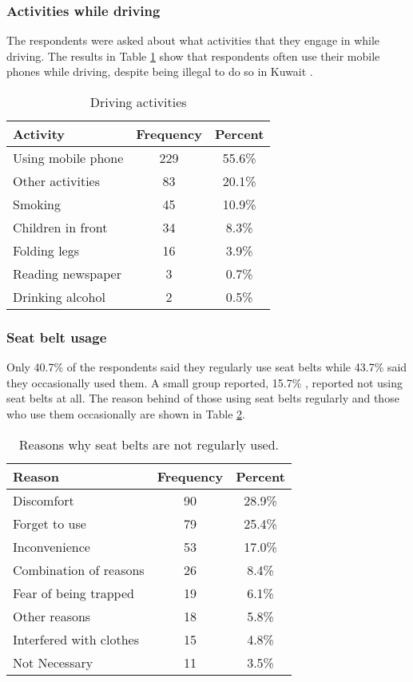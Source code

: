 \documentclass[preprint,12pt,a4paper,authoryear]{elsarticle}
\begin{document}
\subsubsection{Activities while driving}
The respondents were asked about what activities that they engage in while driving. The results in Table \ref{tab:activities} show that respondents often use their mobile phones while driving, despite being illegal to do so in Kuwait \citep{MOI2014}.

\begin{table}[H]
\centering
\caption{Driving activities}
\label{tab:activities}
\begin{tabular}{@{}lcc@{}}
\toprule
\textbf{Activity} & \textbf{Frequency} & \textbf{Percent} \\ \midrule
Using mobile phone & 229 & 55.6\% \\
Other activities & 83 & 20.1\% \\
Smoking & 45 & 10.9\% \\
Children in front & 34 & 8.3\% \\
Folding legs & 16 & 3.9\% \\
Reading newspaper & 3 & 0.7\% \\
Drinking alcohol & 2 & 0.5\% \\ \bottomrule
\end{tabular}
\end{table}

\subsubsection{Seat belt usage}
Only 40.7\% of the respondents said they regularly use seat belts while 43.7\% said they occasionally used them. A small group reported, 15.7\% , reported not using seat belts at all. The reason behind of those using seat belts regularly  and those who use them occasionally  are shown in Table \ref{tab:excuses}. 

\begin{table}[H]
\centering
\caption{Reasons why seat belts are not regularly used.}
\label{tab:excuses}
\begin{tabular}{@{}lcc@{}}
\toprule
\textbf{Reason} & \textbf{Frequency} & \textbf{Percent} \\ \midrule
Discomfort & 90 & 28.9\% \\
Forget to use & 79 & 25.4\% \\
Inconvenience & 53 & 17.0\% \\
Combination of reasons & 26 & 8.4\% \\
Fear of being trapped & 19 & 6.1\% \\
Other reasons & 18 & 5.8\% \\
Interfered with clothes & 15 & 4.8\% \\
Not Necessary & 11 & 3.5\% \\ \bottomrule
\end{tabular}
\end{table}
\end{document}
